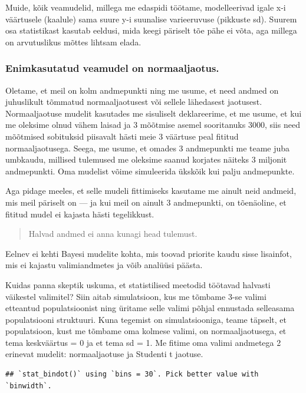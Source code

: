 \documentclass[]{book}
\begin{document}
Muide, kõik veamudelid, millega me edaspidi töötame, modelleerivad igale
x-i väärtusele (kaalule) sama suure y-i suunalise varieeruvuse (pikkuste
sd). Suurem osa statistikast kasutab eeldusi, mida keegi päriselt tõe
pähe ei võta, aga millega on arvutuslikus mõttes lihtsam elada.

\subsubsection{Enimkasutatud veamudel on
normaaljaotus.}\label{enimkasutatud-veamudel-on-normaaljaotus.}

Oletame, et meil on kolm andmepunkti ning me usume, et need andmed on
juhuslikult tõmmatud normaaljaotusest või sellele lähedasest jaotusest.
Normaaljaotuse mudelit kasutades me sisuliselt deklareerime, et me
usume, et kui me oleksime olnud vähem laisad ja 3 mõõtmise asemel
sooritanuks 3000, siis need mõõtmised sobituksid piisavalt hästi meie 3
väärtuse peal fititud normaaljaotusega. Seega, me usume, et omades 3
andmepunkti me teame juba umbkaudu, millised tulemused me oleksime
saanud korjates näiteks 3 miljonit andmepunkti. Oma mudelist võime
simuleerida ükskõik kui palju andmepunkte.

Aga pidage meeles, et selle mudeli fittimiseks kasutame me ainult neid
andmeid, mis meil päriselt on --- ja kui meil on ainult 3 andmepunkti,
on tõenäoline, et fititud mudel ei kajasta hästi tegelikkust.

\begin{quote}
Halvad andmed ei anna kunagi head tulemust.
\end{quote}

Eelnev ei kehti Bayesi mudelite kohta, mis toovad priorite kaudu sisse
lisainfot, mis ei kajastu valimiandmetes ja võib analüüsi päästa.

Kuidas panna skeptik uskuma, et statistilised meetodid töötavad halvasti
väikestel valimitel? Siin aitab simulatsioon, kus me tõmbame 3-se valimi
etteantud populatsioonist ning üritame selle valimi põhjal ennustada
selleasama populatsiooni struktuuri. Kuna tegemist on simulatsiooniga,
teame täpselt, et populatsioon, kust me tõmbame oma kolmese valimi, on
normaaljaotusega, et tema keskväärtus = 0 ja et tema sd = 1. Me fitime
oma valimi andmetega 2 erinevat mudelit: normaaljaotuse ja Studenti t
jaotuse.

\begin{verbatim}
## `stat_bindot()` using `bins = 30`. Pick better value with `binwidth`.
\end{verbatim}
\end{document}
